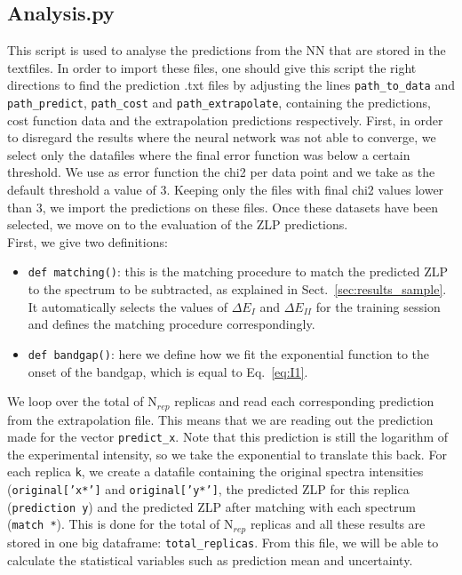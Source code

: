 \subsection{Analysis.py}
This script is used to analyse the predictions from the NN that are stored in the textfiles. 
%
In order to import these files, 
one should give this script the right directions to find the prediction .txt files
by adjusting the lines {\tt path\_to\_data} and {\tt path\_predict}, {\tt path\_cost} and {\tt path\_extrapolate}, 
containing the predictions, cost function data and the extrapolation predictions respectively.
%
First, in order to disregard the results where the neural network was not able to converge,
we select only the datafiles where the final error function was below a certain threshold. 
%
We use as error function the chi2 per data point and we take as the default threshold a value of 3. 
%
Keeping only the files with final chi2 values lower than 3, we import the predictions on these files.
%
Once these datasets have been selected, we move on to the evaluation of the ZLP predictions. 
%
\\

First, we give two definitions: 
\begin{itemize}
\item {\tt def matching()}: this is the matching procedure to match the predicted ZLP to the spectrum
to be subtracted, as explained in Sect.~\ref{sec:results_sample}. 
%
It automatically selects the
values of $\Delta E_I$ and $\Delta E_{II}$ for the training session and defines the matching procedure
correspondingly.
\item {\tt def bandgap()}: here we define how we fit the exponential function to the onset of the bandgap,
which is equal to Eq.~\ref{eq:I1}. 
\end{itemize}


We loop over the total of N$_{rep}$ replicas and read each corresponding prediction from the 
extrapolation file. 
%
This means that we are reading out the prediction made for the vector {\tt predict\_x}. Note that
this prediction is still the logarithm of the experimental intensity, so we take the exponential
to translate this back.
%
For each replica {\tt k}, we create a datafile containing the original spectra intensities 
({\tt original['x*']} and {\tt original['y*']}, the predicted ZLP for this replica ({\tt prediction y}) 
and the predicted ZLP after matching with each spectrum ({\tt match *}). 
%
This is done for the total of N$_{rep}$ replicas and all these results are stored in one big 
dataframe: {\tt total\_replicas}. 
%
From this file, we will be able to calculate the
statistical variables such as prediction mean and uncertainty. 
%





















